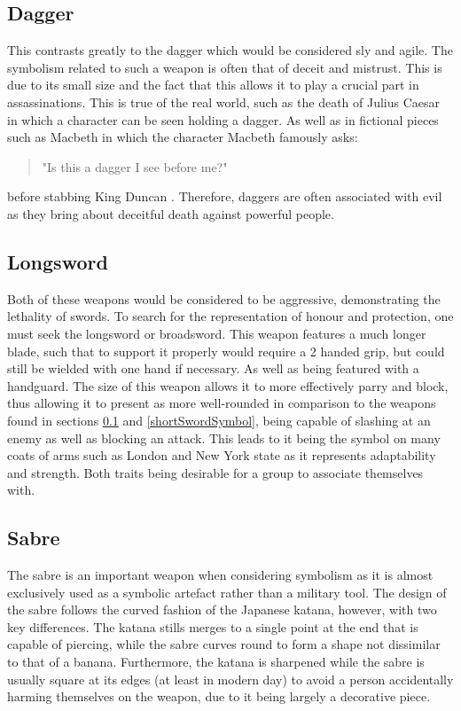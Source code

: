 \documentclass{article}
\begin{document}
\subsection{Dagger} \label{daggerSymbol}
This contrasts greatly to the dagger which would be considered sly and agile. The symbolism related to such a weapon is often that of deceit and mistrust. This is due to its small size and the fact that this allows it to play a crucial part in assassinations. This is true of the real world, such as the death of Julius Caesar \parencite{caesar} in which a character can be seen holding a dagger. As well as in fictional pieces such as Macbeth in which the character Macbeth famously asks: \begin{quote}
    "Is this a dagger I see before me?"
\end{quote}
before stabbing King Duncan \parencite{macbeth}. Therefore, daggers are often associated with evil as they bring about deceitful death against powerful people.

\subsection{Longsword} \label{longswordSymbol}
Both of these weapons would be considered to be aggressive, demonstrating the lethality of swords. To search for the representation of honour and protection, one must seek the longsword or broadsword. This weapon features a much longer blade, such that to support it properly would require a 2 handed grip, but could still be wielded with one hand if necessary. As well as being featured with a handguard. The size of this weapon allows it to more effectively parry and block, thus allowing it to present as more well-rounded in comparison to the weapons found in sections \ref{daggerSymbol} and \ref{shortSwordSymbol}, being capable of slashing at an enemy as well as blocking an attack. This leads to it being the symbol on many coats of arms such as London \parencite{fox1894book} and New York state \parencite{newyorkflag} as it represents adaptability and strength. Both traits being desirable for a group to associate themselves with.

\subsection{Sabre} \label{saberSymbol}
The sabre is an important weapon when considering symbolism as it is almost exclusively used as a symbolic artefact rather than a military tool. The design of the sabre follows the curved fashion of the Japanese katana, however, with two key differences. The katana stills merges to a single point at the end that is capable of piercing, while the sabre curves round to form a shape not dissimilar to that of a banana. Furthermore, the katana is sharpened while the sabre is usually square at its edges (at least in modern day) to avoid a person accidentally harming themselves on the weapon, due to it being largely a decorative piece.
\end{document}
